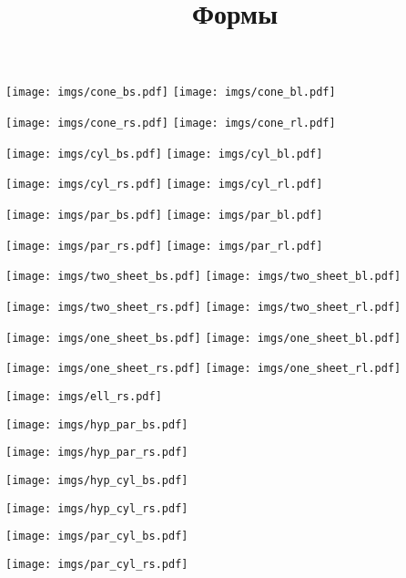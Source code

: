 \documentclass{article}
\title{Формы}
\begin{document}
\maketitle
\newpage 

\texttt{[image: imgs/cone\_bs.pdf]}
\texttt{[image: imgs/cone\_bl.pdf]}

\texttt{[image: imgs/cone\_rs.pdf]}
\texttt{[image: imgs/cone\_rl.pdf]}
\newpage 

\texttt{[image: imgs/cyl\_bs.pdf]}
\texttt{[image: imgs/cyl\_bl.pdf]}

\texttt{[image: imgs/cyl\_rs.pdf]}
\texttt{[image: imgs/cyl\_rl.pdf]}
\newpage 

\texttt{[image: imgs/par\_bs.pdf]}
\texttt{[image: imgs/par\_bl.pdf]}

\texttt{[image: imgs/par\_rs.pdf]}
\texttt{[image: imgs/par\_rl.pdf]}
\newpage 

\texttt{[image: imgs/two\_sheet\_bs.pdf]}
\texttt{[image: imgs/two\_sheet\_bl.pdf]}

\texttt{[image: imgs/two\_sheet\_rs.pdf]}
\texttt{[image: imgs/two\_sheet\_rl.pdf]}
\newpage 

\texttt{[image: imgs/one\_sheet\_bs.pdf]}
\texttt{[image: imgs/one\_sheet\_bl.pdf]}

\texttt{[image: imgs/one\_sheet\_rs.pdf]}
\texttt{[image: imgs/one\_sheet\_rl.pdf]}
\newpage 

\texttt{[image: imgs/ell\_rs.pdf]}
\newpage

\texttt{[image: imgs/hyp\_par\_bs.pdf]}

\texttt{[image: imgs/hyp\_par\_rs.pdf]}
\newpage

\texttt{[image: imgs/hyp\_cyl\_bs.pdf]}

\texttt{[image: imgs/hyp\_cyl\_rs.pdf]}
\newpage

\texttt{[image: imgs/par\_cyl\_bs.pdf]}

\texttt{[image: imgs/par\_cyl\_rs.pdf]}
\end{document}
